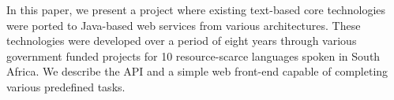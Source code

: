 In this paper, we present a project where existing text-based core technologies were ported to Java-based web services from various architectures. These technologies were developed over a period of eight years through various government funded projects for 10 resource-scarce languages spoken in South Africa. We describe the API and a simple web front-end capable of completing various predefined tasks.
